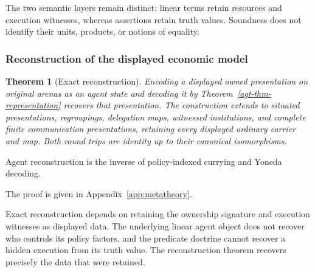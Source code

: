 \documentclass[11pt,a4paper]{article}
\numberwithin{equation}{section}
\newtheorem{theorem}{Theorem}[section]
\theoremstyle{definition}
\theoremstyle{remark}
\theoremstyle{plain}
\providecommand{\Ag}{\mathsf{Ag}}
\providecommand{\I}{\mathsf{I}}
\providecommand{\Set}{\mathbf{Set}}
\providecommand{\id}{\mathop{\mathrm{id}}}
\begin{document}
The two semantic layers remain distinct: linear terms retain
resources and execution witnesses, whereas assertions retain truth
values. Soundness does not identify their units, products, or
notions of equality.

\subsubsection{Reconstruction of the displayed economic model}

\begin{theorem}[Exact reconstruction]
\label{agt-thm-reconstruction}
Encoding a displayed owned presentation on original arenas as an agent
state and decoding it by Theorem~\ref{agt-thm-representation} recovers that
presentation. The construction extends to situated presentations,
regroupings, delegation maps, witnessed institutions, and complete finite
communication presentations, retaining every displayed ordinary carrier
and map. Both round trips are identity up to their canonical isomorphisms.
\end{theorem}

\noindent Agent reconstruction is the inverse of policy-indexed currying and Yoneda decoding.
\begin{center}
\end{center}

\par\noindent The proof is given in Appendix~\ref{app:metatheory}.

Exact reconstruction depends on retaining the ownership signature
and execution witnesses as displayed data. The underlying linear
agent object does not recover who controls its policy factors, and
the predicate doctrine cannot recover a hidden execution from its
truth value. The reconstruction theorem recovers precisely the data
that were retained.
\end{document}
